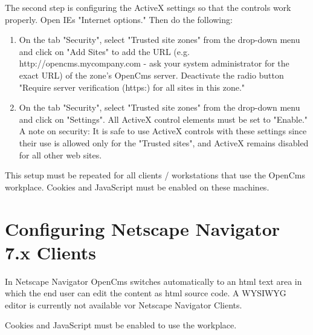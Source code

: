 The second step is configuring the ActiveX settings so that the
controls work properly. Open IEs "Internet options." Then do the
following:

\begin{enumerate}
\item On the tab "Security", select "Trusted site zones" from the
drop-down menu and click on "Add Sites" to add the URL (e.g.
http://opencms.mycompany.com - ask your system administrator for
the exact URL) of the zone's OpenCms server. Deactivate the radio
button "Require server verification (https:) for all sites in this
zone."
\item On the tab "Security", select "Trusted site zones"
from the drop-down menu and click on "Settings". All ActiveX
control elements must be set to "Enable." A note on security: It
is safe to use ActiveX controls with these settings since their
use is allowed only for the "Trusted sites", and ActiveX remains
disabled for all other web sites.
\end{enumerate}

This setup must be repeated for all clients / workstations that
use the OpenCms workplace. Cookies and JavaScript must be enabled 
on these machines.


\section{Configuring Netscape Navigator 7.x Clients}

In Netscape Navigator OpenCms switches automatically to an html 
text area in which the end user can edit the content as html 
source code. A WYSIWYG editor is currently not available vor
Netscape Navigator Clients.

Cookies and JavaScript must be enabled to use the workplace.
